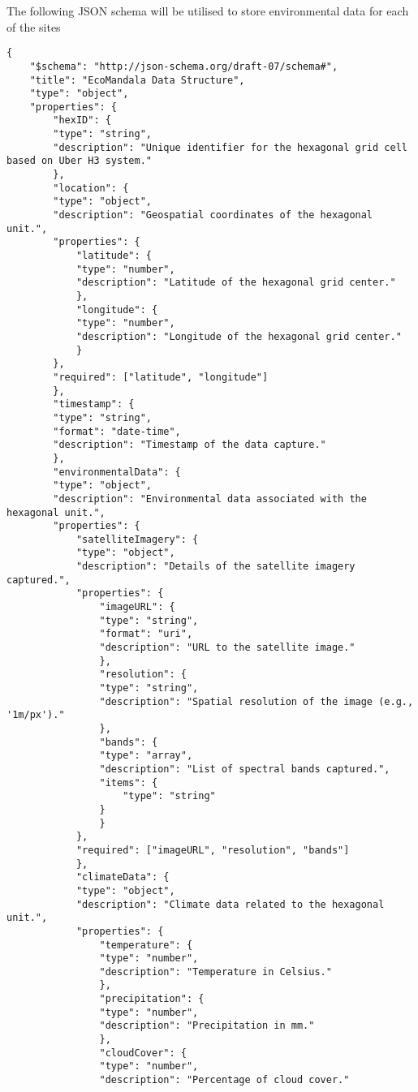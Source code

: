 The following JSON schema will be utilised to store environmental data for each of the sites
\begin{verbatim}
{
    "$schema": "http://json-schema.org/draft-07/schema#",
    "title": "EcoMandala Data Structure",
    "type": "object",
    "properties": {
        "hexID": {
        "type": "string",
        "description": "Unique identifier for the hexagonal grid cell based on Uber H3 system."
        },
        "location": {
        "type": "object",
        "description": "Geospatial coordinates of the hexagonal unit.",
        "properties": {
            "latitude": {
            "type": "number",
            "description": "Latitude of the hexagonal grid center."
            },
            "longitude": {
            "type": "number",
            "description": "Longitude of the hexagonal grid center."
            }
        },
        "required": ["latitude", "longitude"]
        },
        "timestamp": {
        "type": "string",
        "format": "date-time",
        "description": "Timestamp of the data capture."
        },
        "environmentalData": {
        "type": "object",
        "description": "Environmental data associated with the hexagonal unit.",
        "properties": {
            "satelliteImagery": {
            "type": "object",
            "description": "Details of the satellite imagery captured.",
            "properties": {
                "imageURL": {
                "type": "string",
                "format": "uri",
                "description": "URL to the satellite image."
                },
                "resolution": {
                "type": "string",
                "description": "Spatial resolution of the image (e.g., '1m/px')."
                },
                "bands": {
                "type": "array",
                "description": "List of spectral bands captured.",
                "items": {
                    "type": "string"
                }
                }
            },
            "required": ["imageURL", "resolution", "bands"]
            },
            "climateData": {
            "type": "object",
            "description": "Climate data related to the hexagonal unit.",
            "properties": {
                "temperature": {
                "type": "number",
                "description": "Temperature in Celsius."
                },
                "precipitation": {
                "type": "number",
                "description": "Precipitation in mm."
                },
                "cloudCover": {
                "type": "number",
                "description": "Percentage of cloud cover."

\end{verbatim}
